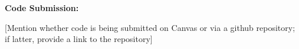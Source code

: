 \documentclass[twoside,11pt]{article}
\renewcommand{\>}{{\rightarrow}}
\newcommand{\1}{{\mathbf 1}}
\newcommand{\0}{{\mathbf 0}}
\begin{document}
\vspace{12pt}

\textbf{Code Submission:}

[Mention whether code is being submitted on Canvas or via a github repository; if latter, provide a link to the repository]


\newpage




















\end{document}
